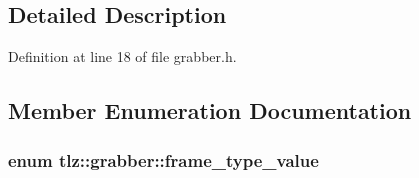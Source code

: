 \subsection{Detailed Description}


Definition at line 18 of file grabber.\+h.



\subsection{Member Enumeration Documentation}
\subsubsection[{\texorpdfstring{frame\+\_\+type\+\_\+value}{frame_type_value}}]{\setlength{\rightskip}{0pt plus 5cm}enum {\bf tlz\+::grabber\+::frame\+\_\+type\+\_\+value}}\hypertarget{classtlz_1_1grabber_a52a1a6be5144a2985397431f66427f0c}{}\label{classtlz_1_1grabber_a52a1a6be5144a2985397431f66427f0c}
